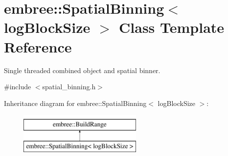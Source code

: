 \hypertarget{classembree_1_1_spatial_binning}{
\section{embree::SpatialBinning$<$ logBlockSize $>$ Class Template Reference}
\label{classembree_1_1_spatial_binning}
}


Single threaded combined object and spatial binner.  




{\ttfamily \#include $<$spatial\_\-binning.h$>$}

Inheritance diagram for embree::SpatialBinning$<$ logBlockSize $>$:\begin{figure}[H]
\begin{center}
\leavevmode
\includegraphics[height=2.000000cm]{classembree_1_1_spatial_binning}
\end{center}
\end{figure}
